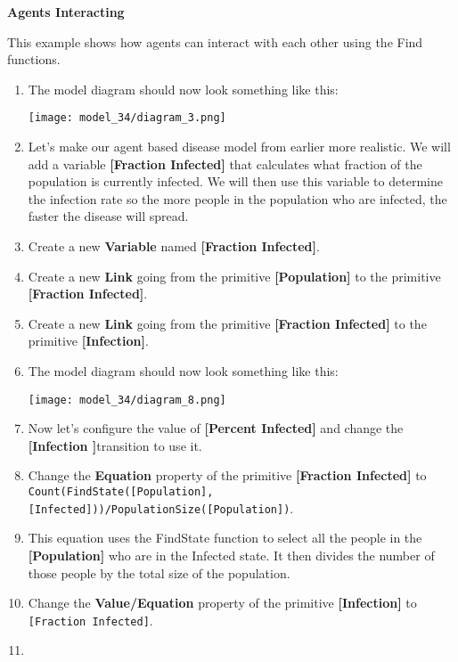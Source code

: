 \documentclass[]{memoir}
\makeatletter
\def\maxwidth{\ifdim\Gin@nat@width>\linewidth\linewidth
\else\Gin@nat@width\fi}
\let\Oldincludegraphics\includegraphics
\renewcommand{\includegraphics}[1]{\Oldincludegraphics[width=\maxwidth]{#1}}
\newcommand{\p}[1]{\textbf{{[}#1{]}}}
\newcommand{\e}[1]{\texttt{#1}}
\renewcommand{\a}[1]{\textbf{#1}}
\makeatother
\begin{document}
\begin{oframed}\textbf{Agents Interacting} 

 This example shows how agents can interact with each other using the Find functions.

\begin{enumerate}
\item The model diagram should now look something like this: \par \begin{minipage}{\linewidth}  \centering \texttt{[image: model\_34/diagram\_3.png]}
\end{minipage}
\item 

Let’s make our agent based disease model from earlier more realistic. We will add a variable \p{Fraction Infected} that calculates what fraction of the population is currently infected. We will then use this variable to determine the infection rate so the more people in the population who are infected, the faster the disease will spread.


\item Create a new \a{Variable} named \p{Fraction Infected}.
\item Create a new \a{Link} going from the primitive \p{Population} to the primitive \p{Fraction Infected}.
\item Create a new \a{Link} going from the primitive \p{Fraction Infected} to the primitive \p{Infection}.
\item The model diagram should now look something like this: \par \begin{minipage}{\linewidth}  \centering \texttt{[image: model\_34/diagram\_8.png]}
\end{minipage}
\item 

Now let's configure the value of \p{Percent Infected} and change the \p{Infection }transition to use it.


\item  Change the \a{Equation} property of the primitive \p{Fraction Infected} to \e{Count(FindState([Population], [Infected]))/PopulationSize([Population])}.
\item 

This equation uses the FindState function to select all the people in the \p{Population} who are in the Infected state. It then divides the number of those people by the total size of the population.


\item  Change the \a{Value/Equation} property of the primitive \p{Infection} to \e{[Fraction Infected]}.
\item 


\end{enumerate}
\end{oframed}
\end{document}
